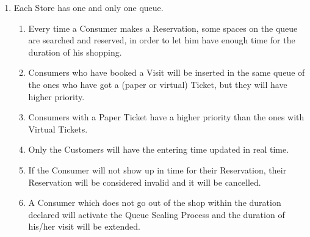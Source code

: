 \documentclass[a4paper, 10pt, oneside]{article}
\begin{document}
\begin{enumerate}[align=left, label={R.\arabic{*}}]
    
    \item \label{req:queueUnique}Each Store has one and only one queue.
    \begin{enumerate}[label={-}]
        \item \label{req:codeUnique:queueReservations}Every time a Consumer makes a Reservation, some spaces on the queue are searched and reserved, in order to let him have enough time for the duration of his shopping.
        \item \label{req:codeUnique:visitsAndQueue} Consumers who have booked a Visit will be inserted in the same queue of the ones who have got a (paper or virtual) Ticket, but they will have higher priority.
        \item \label{req:codeUnique:ticketsAndQueue} Consumers with a Paper Ticket have a higher priority than the ones with Virtual Tickets.
        \item Only the Customers will have the entering time updated in real time. %
        \item \label{req:codeUnique:invalidateLate} If the Consumer will not show up in time for their Reservation, %
        their Reservation will be considered invalid and it will be cancelled.
        \item \label{req:codeUnique:exeedDuration} A Consumer which does not go out of the shop within the duration declared will activate the Queue Scaling Process and the duration of his/her visit will be extended.%

\end{enumerate}
\end{enumerate}
\end{document}
